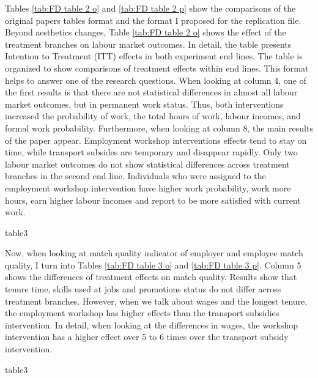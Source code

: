 \documentclass{article}
\begin{document}
\noindent Tables \ref{tab:FD table 2 o} and \ref{tab:FD table 2 p} show the comparisons of the original papers tables format and the format I proposed for the replication file. Beyond aesthetics changes, Table \ref{tab:FD table 2 o} shows the effect of the treatment branches on labour market outcomes. In detail, the table presents Intention to Treatment (ITT) effects in both experiment end lines. The table is organized to show comparisons of treatment effects within end lines. This format helps to answer one of the research questions. When looking at column 4, one of the first results is that there are not statistical differences in almost all labour market outcomes, but in permanent work status. Thus, both interventions increased the probability of work, the total hours of work, labour incomes, and formal work probability. Furthermore, when looking at column 8, the main results of the paper appear. Employment workshop interventions effects tend to stay on time, while transport subsides are temporary and disappear rapidly. Only two labour market outcomes do not show statistical differences across treatment branches in the second end line. Individuals who were assigned to the employment workshop intervention have higher work probability, work more hours, earn higher labour incomes and report to be more satisfied with current work.

\medskip


{table3}\label{tab:FD table 3 o}

\noindent Now, when looking at match quality indicator of employer and employee match quality, I turn into Tables \ref{tab:FD table 3 o} and \ref{tab:FD table 3 p}. Column 5 shows the differences of treatment effects on match quality. Results show that tenure time, skills used at jobs and promotions status do not differ across treatment branches. However, when we talk about wages and the longest tenure, the employment workshop has higher effects than the transport subsidies intervention. In detail, when looking at the differences in wages, the workshop intervention has a higher effect over 5 to 6 times over the transport subsidy intervention. 

{table3}\label{tab:FD table 3 p}

\end{document}
